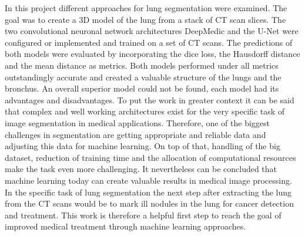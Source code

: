 
In this project different approaches for lung segmentation were examined. The goal was to create a 3D model of the lung from a stack of CT scan slices. The two convolutional neuronal network architectures DeepMedic and the U-Net were configured or implemented and trained on a set of CT scans. The predictions of both models were evaluated by incorporating the dice loss, the Hausdorff distance and the mean distance as metrics. Both models performed under all metrics outstandingly accurate and created a valuable structure of the lungs and the bronchus. An overall superior model could not be found, each model had its advantages and disadvantages.\newline
To put the work in greater context it can be said that complex and well working architectures exist for the very specific task of image segmentation in medical applications. Therefore, one of the biggest challenges in segmentation are getting appropriate and reliable data and adjusting this data for machine learning. On top of that, handling of the big dataset, reduction of training time and the allocation of computational resources make the task even more challenging.\newline
It nevertheless can be concluded that machine learning today can create valuable results in medical image processing. In the specific task of lung segmentation the next step after extracting the lung from the CT scans would be to mark ill nodules in the lung for cancer detection and treatment. This work is therefore a helpful first step to reach the goal of improved medical treatment through machine learning approaches.